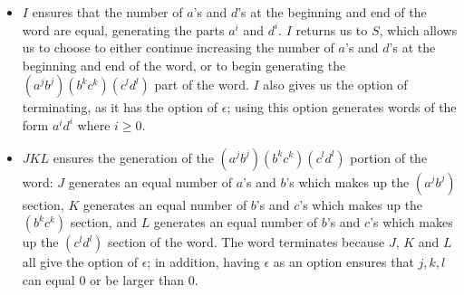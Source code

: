 \documentclass{article}
\begin{document}
\begin{itemize}
    \item \(I\) ensures that the number of \(a\)'s and \(d\)'s at the beginning and end of the word are equal, generating the parts \(a^i\) and \(d^i\). \(I\) returns us to \(S\), which allows us to choose to either continue increasing the number of \(a\)'s and \(d\)'s at the beginning and end of the word, or to begin generating the \((a^j b^j) (b^k c^k) (c^l d^l)\) part of the word. \(I\) also gives us the option of terminating, as it has the option of \(\epsilon\); using this option generates words of the form \(a^i d^i\) where \(i \geq 0\).
    \item \(JKL\) ensures the generation of the \((a^j b^j) (b^k c^k) (c^l d^l)\) portion of the word: \(J\) generates an equal number of \(a\)'s and \(b\)'s which makes up the \((a^j b^j)\) section, \(K\) generates an equal number of \(b\)'s and \(c\)'s which makes up the \((b^k c^k)\) section, and \(L\) generates an equal number of \(b\)'s and \(c\)'s which makes up the \((c^l d^l)\) section of the word. The word terminates because \(J\), \(K\) and \(L\) all give the option of \(\epsilon\); in addition, having \(\epsilon\) as an option ensures that \(j, k, l\) can equal \(0\) or be larger than \(0\).
\end{itemize}

\newpage
\end{document}
